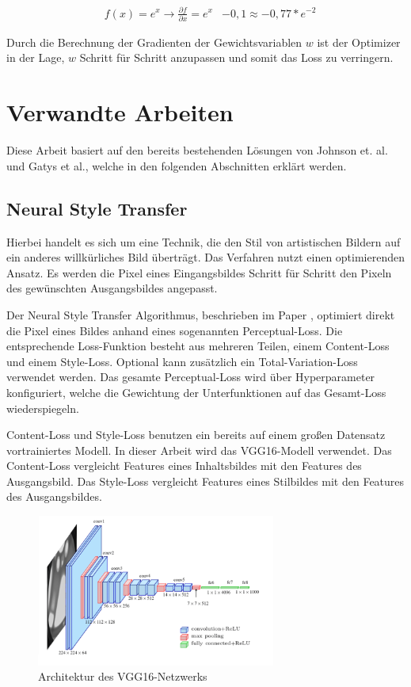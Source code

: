 \begin{align}
	& f(x) = e^{x} \rightarrow \frac{\partial f}{\partial x} = e^{x}
	& -0,1 \approx -0,77 * e^{-2}
\end{align}

Durch die Berechnung der Gradienten der Gewichtsvariablen $ w $ ist der Optimizer in der Lage, $ w $ Schritt für Schritt anzupassen und somit das Loss zu verringern.

\pagebreak

\section{Verwandte Arbeiten}

Diese Arbeit basiert auf den bereits bestehenden Lösungen von Johnson et. al. und Gatys et al., welche in den folgenden Abschnitten erklärt werden.

\subsection{Neural Style Transfer}
\label{sec:neural_style_transfer}

Hierbei handelt es sich um eine Technik, die den Stil von artistischen Bildern auf ein anderes willkürliches Bild überträgt.
Das Verfahren nutzt einen optimierenden Ansatz. Es werden die Pixel eines Eingangsbildes Schritt für Schritt den Pixeln 
des gewünschten Ausgangsbildes angepasst. 

Der Neural Style Transfer Algorithmus, beschrieben im Paper \cite{DBLP:journals/corr/GatysEB15a}, optimiert direkt die Pixel eines Bildes anhand eines sogenannten Perceptual-Loss. Die entsprechende Loss-Funktion besteht aus mehreren Teilen, einem Content-Loss und einem Style-Loss. Optional kann zusätzlich ein Total-Variation-Loss verwendet werden. Das gesamte Perceptual-Loss wird über Hyperparameter konfiguriert, welche die Gewichtung der Unterfunktionen auf das Gesamt-Loss wiederspiegeln.

Content-Loss und Style-Loss benutzen ein bereits auf einem großen Datensatz vortrainiertes Modell. In dieser Arbeit wird das VGG16-Modell \cite{DBLP:journals/corr/SimonyanZ14a} verwendet. Das Content-Loss vergleicht Features eines Inhaltsbildes mit den Features des Ausgangsbild. Das Style-Loss vergleicht Features eines Stilbildes mit den Features des Ausgangsbildes.

\begin{figure}[H]
	\centering
	\includegraphics[width=0.70\textwidth]{resources/content/vgg16.png}
	\caption{Architektur des VGG16-Netzwerks \cite{vgg16_img}}
	\label{img:vgg16_img}
\end{figure}

